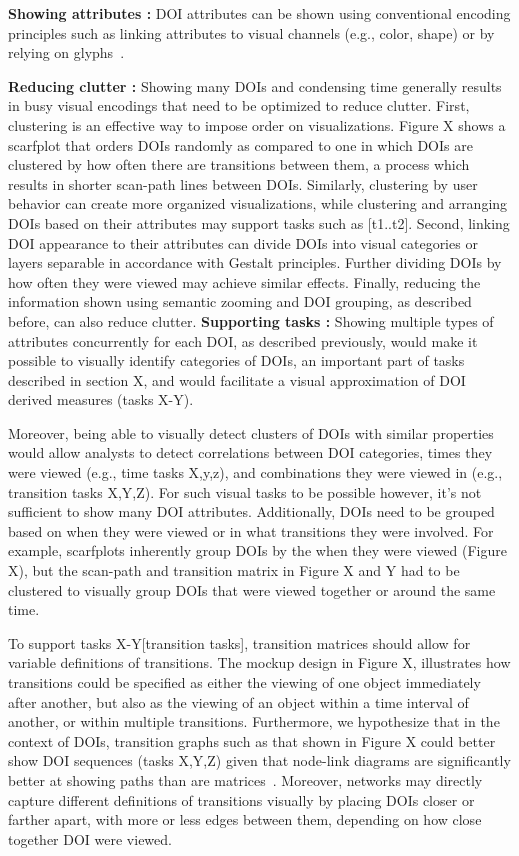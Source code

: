 \textbf{Showing attributes :} DOI attributes can be shown using conventional encoding principles such as linking attributes to visual channels (e.g., color, shape) or by relying on glyphs~\cite{maguire2012taxonomy}. 

\textbf{Reducing clutter :}
Showing many DOIs and condensing time generally results in busy visual encodings that need to be optimized to reduce clutter. First, clustering is an effective way to impose order on visualizations. Figure X shows a scarfplot that orders DOIs randomly as compared to one in which DOIs are clustered by how often there are transitions between them, a process which results in shorter scan-path lines between DOIs. Similarly, clustering by user behavior can create more organized visualizations, while clustering and arranging DOIs based on their attributes may support tasks such as [t1..t2]. Second, linking DOI appearance to their attributes can divide DOIs into visual categories or layers separable in accordance with Gestalt principles. Further dividing DOIs by how often they were viewed may achieve similar effects.  Finally, reducing the information shown using semantic zooming and DOI grouping, as described before, can also reduce clutter. 
\textbf{Supporting tasks :}
Showing multiple types of attributes concurrently for each DOI, as described previously, would make it possible to visually identify categories of DOIs, an important part of tasks described in section X, and would facilitate a visual approximation of DOI derived measures (tasks X-Y). 

Moreover, being able to visually detect clusters of DOIs with similar properties would allow analysts to detect correlations between DOI categories, times they were viewed (e.g., time tasks X,y,z), and combinations they were viewed in (e.g., transition tasks X,Y,Z). For such visual tasks to be possible however, it's not sufficient to show many DOI attributes. Additionally, DOIs need to be grouped based on when they were viewed or in what transitions they were involved. For example, scarfplots inherently group DOIs by the when they were viewed (Figure X), but the scan-path and transition matrix in Figure X and Y had to be clustered to visually group DOIs that were viewed together or around the same time. 

To support tasks X-Y[transition tasks], transition matrices should allow for  variable definitions of transitions. The mockup design in Figure X, illustrates how transitions could be specified as either the viewing of one object immediately after another, but also as the viewing of an object within a time interval of another, or within multiple transitions. Furthermore, we hypothesize that in the context of DOIs, transition graphs such as that shown in Figure X could better show DOI sequences (tasks X,Y,Z) given that node-link diagrams are significantly better at showing paths than are matrices~\cite{ghoniem2004comparison, Jianu-poster}.  Moreover, networks may directly capture different definitions of transitions visually by placing DOIs closer or farther apart, with more or less edges between them, depending on how close together DOI were viewed. 

